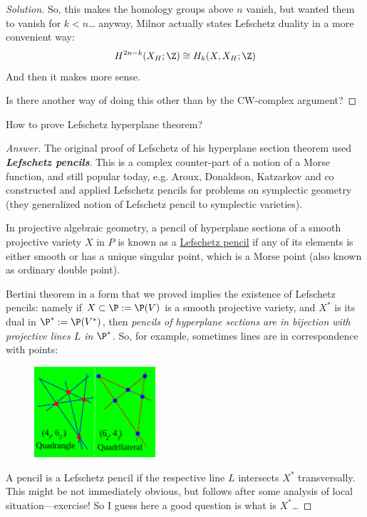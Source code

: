 \begin{proof}[Solution]
So, this makes the homology groups above $n$ vanish, but wanted them to vanish for $k<n$… anyway, Milnor actually states Lefschetz duality in a more convenient way:
\begin{equation*}
	H^{2n-k}(X_H;\Z)\cong H_{k}(X,X_H;\Z)
\end{equation*}
And then it makes more sense.

Is there another way of doing this other than by the CW-complex argument?
\end{proof}


\begin{question}[]
	How to prove Lefschetz hyperplane theorem?
\end{question}
\begin{proof}[Answer]
	The original proof of Lefschetz of his hyperplane section theorem used \textit{\textbf{Lefschetz pencils}}. This is a complex counter-part of a notion of a Morse function, and still popular today, e.g. Aroux, Donaldson, Katzarkov and co constructed and applied Lefschetz pencils for problems on symplectic geometry (they generalized notion of Lefschetz pencil to symplectic varieties).

	In projective algebraic geometry, a pencil of hyperplane sections of a smooth projective variety $X$ in $P$ is known as a \href{https://en.wikipedia.org/wiki/Lefschetz_pencil}{Lefschetz pencil} if any of its elements is either smooth or has a unique singular point, which is a Morse point (also known as ordinary double point).

	Bertini theorem in a form that we proved implies the existence of Lefschetz pencils: namely if $X\subset \P:=\P(V)$ is a smooth projective variety, and $X^*$ is its dual in $\P^*:=\P(V^*)$, then \textit{pencils of hyperplane sections are in bijection with projective lines $L$ in $\P^*$}. {\color{cyan}So, for example, sometimes lines are in correspondence with points:}
	\begin{figure}[H]
		\centering
		\includegraphics[width=0.4\textwidth]{duality}
	\end{figure}	
	A pencil is a Lefschetz pencil if the respective line $L$ intersects $X^*$ transversally. {\color{azure}This might be not immediately obvious, but follows after some analysis of local situation---exercise!} {\color{magenta}So I guess here a good question is what is $X^*$…} 


\end{proof}
